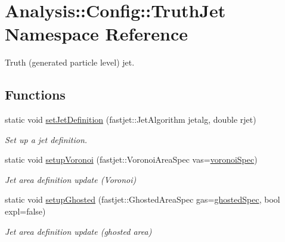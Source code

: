 \hypertarget{namespaceAnalysis_1_1Config_1_1TruthJet}{}\section{Analysis\+:\+:Config\+:\+:Truth\+Jet Namespace Reference}
\label{namespaceAnalysis_1_1Config_1_1TruthJet}


Truth (generated particle level) jet.  


\subsection*{Functions}
\begin{DoxyCompactItemize}
\item 
static void \hyperlink{namespaceAnalysis_1_1Config_1_1TruthJet_a483f9e093914b5a94c91df3a771fe890}{set\+Jet\+Definition} (fastjet\+::\+Jet\+Algorithm jetalg, double rjet)
\begin{DoxyCompactList}\small\item\em Set up a jet definition. \end{DoxyCompactList}\item 
static void \hyperlink{namespaceAnalysis_1_1Config_1_1TruthJet_a5c5eb24dbfb9c811a772cc12ecd0a4cc}{setup\+Voronoi} (fastjet\+::\+Voronoi\+Area\+Spec vas=\hyperlink{namespaceAnalysis_1_1Config_1_1TruthJet_aacd5481a0b6ada44cb0c879204391075}{voronoi\+Spec})
\begin{DoxyCompactList}\small\item\em Jet area definition update (Voronoi) \end{DoxyCompactList}\item 
static void \hyperlink{namespaceAnalysis_1_1Config_1_1TruthJet_a369676042ed8902d6f4dd9aa6dea3c23}{setup\+Ghosted} (fastjet\+::\+Ghosted\+Area\+Spec gas=\hyperlink{namespaceAnalysis_1_1Config_1_1TruthJet_a661169c3a6db009e6993226459cf8124}{ghosted\+Spec}, bool expl=false)
\begin{DoxyCompactList}\small\item\em Jet area definition update (ghosted area) \end{DoxyCompactList}\end{DoxyCompactItemize}
